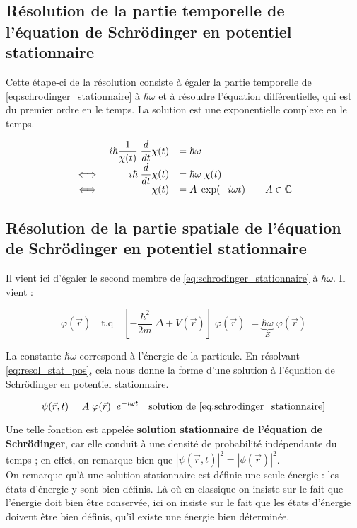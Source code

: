 \documentclass{book}
\begin{document}
\subsection{Résolution de la partie temporelle de l'équation de Schrödinger en potentiel stationnaire}
Cette étape-ci de la résolution consiste à égaler la partie temporelle de \eqref{eq:schrodinger_stationnaire} à $\hbar \omega$ et à résoudre l'équation différentielle, qui est du premier ordre en le temps. La solution est une exponentielle complexe en le temps.

\begin{equation} \label{eq:resol_stat_temps}
\begin{array}{lrl r}
& i\hbar \dfrac{1}{\chi(t)} \; \dfrac{d}{dt} \chi(t) &= \hbar \omega  &\\
\iff& i \hbar \; \dfrac{d}{dt} \chi(t) &= \hbar \omega \;  \chi(t)  &\\
\iff & \chi(t) &= A \; \exp(-i\omega t)  &\quad A \in \mathbb{C}
\end{array}
\end{equation}


\subsection{Résolution de la partie spatiale de l'équation de Schrödinger en potentiel stationnaire}
Il vient ici d'égaler le second membre de \eqref{eq:schrodinger_stationnaire} à $\hbar \omega$. Il vient :

\begin{equation} \label{eq:resol_stat_pos}
\varphi(\vec r) \quad \mathrm{t.q} \quad \left[-\dfrac{\hbar ^2}{2m} \; \Delta + V(\vec r) \right] \; \varphi(\vec r) \; = \underbrace{\hbar	\omega}_E \; \varphi(\vec r)
\end{equation}


La constante $\hbar \omega$ correspond à l'énergie de la particule. En résolvant \eqref{eq:resol_stat_pos}, cela nous donne la forme d'une solution à l'équation de Schrödinger en potentiel stationnaire.

\begin{equation}
\psi(\vec r, t) = A \; \varphi(\vec r) \; \;e^{-i\omega t} \quad \text{solution de \eqref{eq:schrodinger_stationnaire}}
\end{equation}


Une telle fonction est appelée \textbf{solution stationnaire de l'équation de Schrödinger}, car elle conduit à une densité de probabilité indépendante du temps ; en effet, on remarque bien que $\left| \psi(\vec{r}, t) \right|^2 = \left| \phi(\vec{r}) \right|^2$. \\
On remarque qu'à une solution stationnaire est définie une seule énergie : les états d'énergie y sont bien définis. Là où en classique on insiste sur le fait que l'énergie doit bien être conservée, ici on insiste sur le fait que les états d'énergie doivent être bien définis, qu'il existe une énergie bien déterminée. \\
\end{document}
